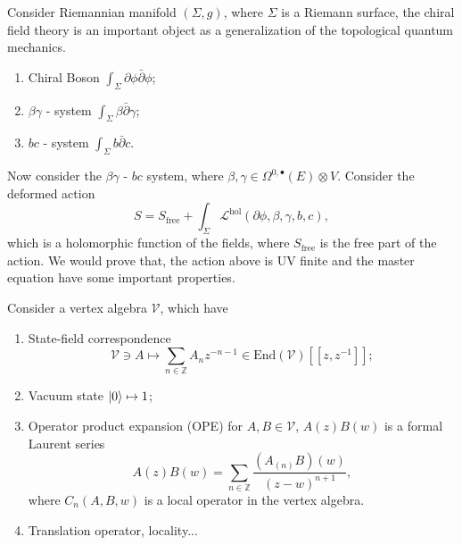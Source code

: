 \documentclass[10pt]{article}
\begin{document}
Consider Riemannian manifold $(\Sigma, g)$, where $ \Sigma$ is a Riemann surface, the chiral field theory is an important object as a generalization of the topological quantum mechanics.
\begin{example}
  \begin{enumerate}[(1)]
    \item Chiral Boson $ \int _{\Sigma} \partial \phi \bar{\partial} \phi$;
    \item $ \beta \gamma$ - system $ \int _{\Sigma} \beta \bar{\partial} \gamma$;
    \item $ bc$ - system $ \int _{\Sigma} b \bar{\partial} c$.
  \end{enumerate}
\end{example}

Now consider the $ \beta \gamma$ - $ bc$ system, where $ \beta ,\gamma \in \Omega^{0, \bullet}(E) \otimes V$. Consider the deformed action
\begin{equation*}
  S = S_{\mathrm{free}} + \int _{\Sigma} \mathcal{L}^{\mathrm{hol}}(\partial \phi, \beta, \gamma, b, c),
\end{equation*}
which is a holomorphic function of the fields, where $ S_{\mathrm{free}}$ is the free part of the action.
We would prove that, the action above is UV finite and the master equation have some important properties.
\begin{definition}
  Consider a vertex algebra $ \mathcal{V}$, which have
  \begin{enumerate}[(1)]
    \item State-field correspondence
      \begin{equation*}
        \mathcal{V} \ni A \mapsto \sum_{n \in \mathbb{Z}} A_{n} z^{-n-1} \in \mathrm{End}(\mathcal{V})[[z, z^{-1}]];
      \end{equation*}
    \item Vacuum state $ \ket{0} \mapsto 1$;
    \item Operator product expansion (OPE) for $ A, B \in \mathcal{V}$, $ A(z)B(w)$ is a formal Laurent series
      \begin{equation*}
        A(z) B(w) = \sum_{n \in \mathbb{Z}} \frac{\left( A_{(n)} B\right)(w)}{(z - w)^{n+1}},
      \end{equation*}
      where $ C_{n}(A, B, w)$ is a local operator in the vertex algebra.
    \item Translation operator, locality...
  \end{enumerate}
\end{definition}
\end{document}
